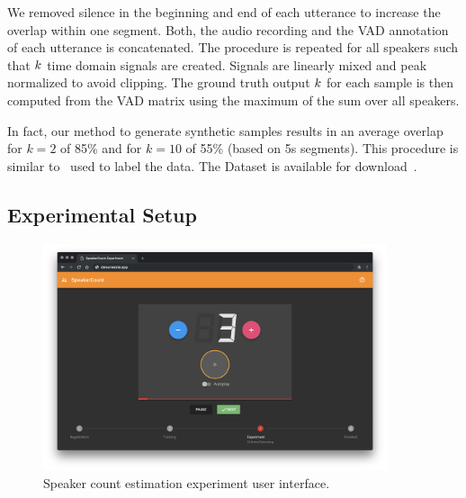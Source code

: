 We removed silence in the beginning and end of each utterance to increase the overlap within one segment.
Both, the audio recording and the VAD annotation of each utterance is concatenated.
The procedure is repeated for all speakers such that \(k \) time domain signals are created.
Signals are linearly mixed and peak normalized to avoid clipping.
The ground truth output \(k \) for each sample is then computed from the VAD matrix using the maximum of the sum over all speakers.
\par
In fact, our method to generate synthetic samples results in an average overlap for \(k=2\) of 85\% and for \(k=10\) of 55\% (based on 5s segments).
This procedure is similar to~\cite{mesaros17} used to label the data.
The Dataset is available for download~\cite{oss_libricount}.

\subsection{Experimental Setup}

\begin{figure}[htb]
    \centering
        \includegraphics[width=0.9\textwidth]{Chapters/07_Analysis_Experiment/figures/experiment_ui.png}
    \caption{Speaker count estimation experiment user interface.}
    \label{fig:user_interface_speaker}
\end{figure}

